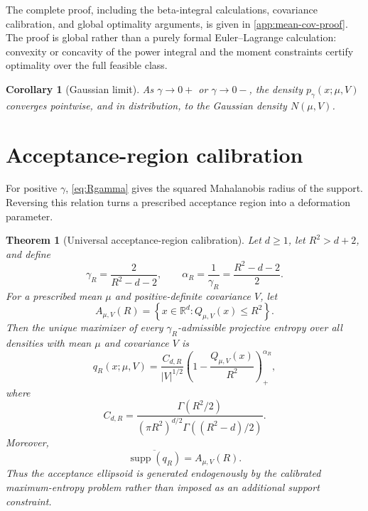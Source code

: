 \documentclass[pdflatex,sn-mathphys-num]{sn-jnl}
\theoremstyle{thmstyleone}
\newtheorem{theorem}{Theorem}
\newtheorem{corollary}{Corollary}
\theoremstyle{thmstyletwo}
\theoremstyle{thmstylethree}
\DeclareMathOperator{\supp}{supp}
\newcommand{\R}{\mathbb{R}}
\begin{document}
The complete proof, including the beta-integral calculations, covariance calibration, and global optimality arguments, is given in \cref{app:mean-cov-proof}. The proof is global rather than a purely formal Euler--Lagrange calculation: convexity or concavity of the power integral and the moment constraints certify optimality over the full feasible class.

\begin{corollary}[Gaussian limit]\label{cor:gaussian-limit}
As $\gamma\to0+$ or $\gamma\to0-$, the density $p_\gamma(x;\mu,V)$ converges pointwise, and in distribution, to the Gaussian density $N(\mu,V)$.
\end{corollary}

\section{Acceptance-region calibration}\label{sec:calibration}

For positive $\gamma$, \cref{eq:Rgamma} gives the squared Mahalanobis radius of the support. Reversing this relation turns a prescribed acceptance region into a deformation parameter.

\begin{theorem}[Universal acceptance-region calibration]\label{thm:calibration}
Let $d\geq1$, let $R^2>d+2$, and define
\begin{equation}
 \gamma_R=\frac{2}{R^2-d-2},
 \qquad
 \alpha_R=\frac{1}{\gamma_R}=\frac{R^2-d-2}{2}.
\label{eq:gammaR}
\end{equation}
For a prescribed mean $\mu$ and positive-definite covariance $V$, let
\[
 A_{\mu,V}(R)
 =\left\{x\in\R^d:Q_{\mu,V}(x)\leq R^2\right\}.
\]
Then the unique maximizer of every $\gamma_R$-admissible projective entropy over all densities with mean $\mu$ and covariance $V$ is
\begin{equation}
 q_R(x;\mu,V)
 =
 \frac{C_{d,R}}{|V|^{1/2}}
 \left(1-\frac{Q_{\mu,V}(x)}{R^2}\right)_+^{\alpha_R},
\label{eq:qR}
\end{equation}
where
\begin{equation}
 C_{d,R}
 =
 \frac{\Gamma(R^2/2)}
 {(\pi R^2)^{d/2}\Gamma((R^2-d)/2)}.
\label{eq:CdR}
\end{equation}
Moreover,
\[
 \overline{\supp(q_R)}=A_{\mu,V}(R).
\]
Thus the acceptance ellipsoid is generated endogenously by the calibrated maximum-entropy problem rather than imposed as an additional support constraint.
\end{theorem}
\end{document}
